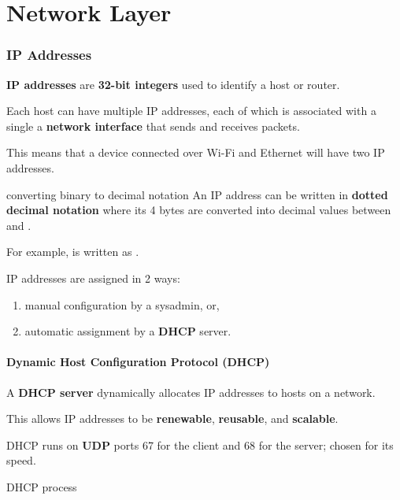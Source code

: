 \part{Network Layer}


\section{IP Addresses}
\textbf{IP addresses} are \textbf{32-bit integers} used to identify a host or router.

Each host can have multiple IP addresses, each of which is associated with a single a \textbf{network interface}
that sends and receives packets.

This means that a device connected over Wi-Fi and Ethernet will have two IP addresses.

\begin{defn}{converting binary to decimal notation}
    An IP address can be written in \textbf{dotted decimal notation} where its 4 bytes
    are converted into decimal values between  and .

    For example,  is written as .
\end{defn}

IP addresses are assigned in 2 ways:
\begin{enumerate}
    \item manual configuration by a sysadmin, or,
    \item automatic assignment by a \textbf{DHCP} server.
\end{enumerate}

\subsection{Dynamic Host Configuration Protocol (DHCP)}
A \textbf{DHCP server} dynamically allocates IP addresses to hosts on a network.

This allows IP addresses to be \textbf{renewable}, \textbf{reusable}, and \textbf{scalable}.

DHCP runs on \textbf{UDP} ports 67 for the client and 68 for the server; chosen for its speed.

\begin{defn}{DHCP process}
    \vspace{0.75em}
    \begin{enumerate}
    \end{enumerate}
\end{defn}

